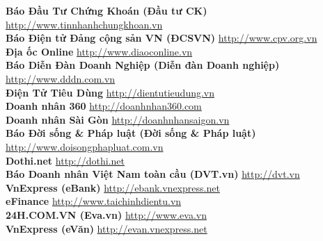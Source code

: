 \textbf{Báo Đầu Tư Chứng Khoán (Đầu tư CK)}  \hspace{0.5in} \href{http://www.tinnhanhchungkhoan.vn}{http://www.tinnhanhchungkhoan.vn} \\ 
\textbf{Báo Điện tử Đảng cộng sản VN (ĐCSVN)}  \hspace{0.5in} \href{http://www.cpv.org.vn}{http://www.cpv.org.vn} \\ 
\textbf{Địa ốc Online}  \hspace{0.5in} \href{http://www.diaoconline.vn}{http://www.diaoconline.vn} \\ 
\textbf{Báo Diễn Đàn Doanh Nghiệp (Diễn đàn Doanh nghiệp)}  \hspace{0.5in} \href{http://www.dddn.com.vn}{http://www.dddn.com.vn} \\ 
\textbf{Điện Tử Tiêu Dùng}  \hspace{0.5in} \href{http://dientutieudung.vn}{http://dientutieudung.vn} \\ 
\textbf{Doanh nhân 360}  \hspace{0.5in} \href{http://doanhnhan360.com}{http://doanhnhan360.com} \\ 
\textbf{Doanh nhân Sài Gòn}  \hspace{0.5in} \href{http://doanhnhansaigon.vn}{http://doanhnhansaigon.vn} \\ 
\textbf{Báo Đời sống & Pháp luật (Đời sống & Pháp luật)}  \hspace{0.5in} \href{http://www.doisongphapluat.com.vn}{http://www.doisongphapluat.com.vn} \\ 
\textbf{Dothi.net}  \hspace{0.5in} \href{http://dothi.net}{http://dothi.net} \\ 
\textbf{Báo Doanh nhân Việt Nam toàn cầu (DVT.vn)}  \hspace{0.5in} \href{http://dvt.vn}{http://dvt.vn} \\ 
\textbf{VnExpress (eBank)}  \hspace{0.5in} \href{http://ebank.vnexpress.net}{http://ebank.vnexpress.net} \\ 
\textbf{eFinance}  \hspace{0.5in} \href{http://www.taichinhdientu.vn}{http://www.taichinhdientu.vn} \\ 
\textbf{24H.COM.VN (Eva.vn)}  \hspace{0.5in} \href{http://www.eva.vn}{http://www.eva.vn} \\ 
\textbf{VnExpress (eVăn)}  \hspace{0.5in} \href{http://evan.vnexpress.net}{http://evan.vnexpress.net} \\ 
